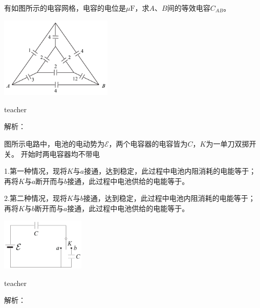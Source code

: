 \begin{example}
有如图所示的电容网格，电容的电位是$\mu\text{F}$，求$A、B$间的等效电容$C_{AB}$。
\begin{flushright}
\includegraphics[width = 0.4\textwidth]{images/elec-problem-17.pdf} 
\end{flushright}

\begin{taggedblock}{teacher}

解析：
\end{taggedblock}
\end{example}


\begin{example}
图所示电路中，电池的电动势为$\mathcal{E}$，两个电容器的电容皆为$C$，$K$为一单刀双掷开关。
开始时两电容器均不带电

1.第一种情况，现将$K$与$a$接通，达到稳定，此过程中电池内阻消耗的电能等于\kong\kong；再将$K$与$a$断开而与$b$接通，此过程中电池供给的电能等于\kong\kong。

2.第二种情况，现将$K$与$b$接通，达到稳定，此过程中电池内阻消耗的电能等于\kong\kong；再将$K$与$b$断开而与$a$接通，此过程中电池供给的电能等于\kong\kong。
\begin{flushright}
\includegraphics[width = 0.3\textwidth]{images/elec-problem-18.pdf} 
\end{flushright}


\begin{taggedblock}{teacher}

解析：
\end{taggedblock}
\end{example}


